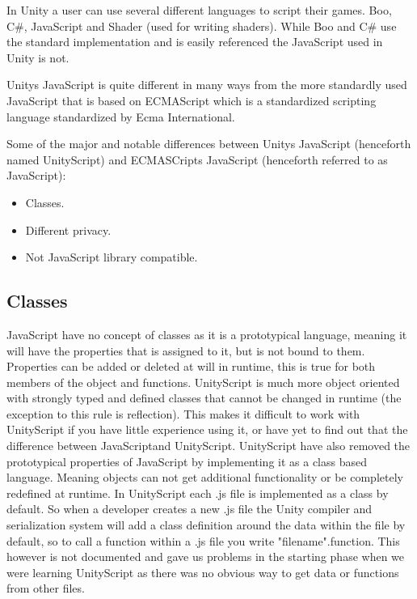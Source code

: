 In Unity a user can use several different languages to script their games. Boo, C\#, JavaScript and Shader (used for writing shaders).
While Boo and C\#  use the standard implementation and is easily referenced the JavaScript used in Unity is not.\cite{WikiScriptVSScript}

Unitys JavaScript is quite different in many ways from the more standardly used JavaScript that is based on ECMAScript\cite{ECMAscipt} which is a standardized scripting
language standardized by Ecma International.

Some of the major and notable differences between Unitys JavaScript (henceforth named UnityScript) and ECMASCripts JavaScript (henceforth referred to as JavaScript):

\begin{itemize}
	\item Classes.
	\item Different privacy.
	\item Not JavaScript library compatible.
\end{itemize}

\subsection {Classes}
JavaScript have no concept of classes as it is a prototypical language, meaning it will have the properties that is assigned to it, but is not bound to them.
Properties can be added or deleted at will in runtime, this is true for both members of the object and functions. 
UnityScript is much more object oriented with strongly typed and defined classes that cannot be changed in runtime (the exception to this rule is reflection).
This makes it difficult to work with UnityScript if you have little experience using it, or have yet to find out that the difference between JavaScriptand UnityScript.
UnityScript have also removed the prototypical properties of JavaScript by implementing it as a class based language. 
Meaning objects can not get additional functionality or be completely redefined at runtime. 
In UnityScript each .js file is implemented as a class by default. 
So when a developer creates a new .js file the Unity compiler and serialization system will add a class definition around the data within the file by default, so to call a function within a .js file you write "filename".function.
This however is not documented and gave us problems in the starting phase when we were learning UnityScript as there was no obvious way to get data or functions from other files.

